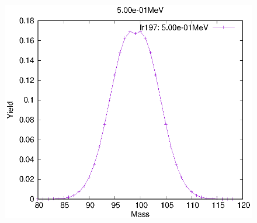 \begin{figure}[htbp]
\begin{minipage}{0.33\textwidth} \begin{center} \includegraphics[width=\textwidth]{YA/Ir197_5.00e-01.eps} \end{center} \end{minipage}
\end{figure}
